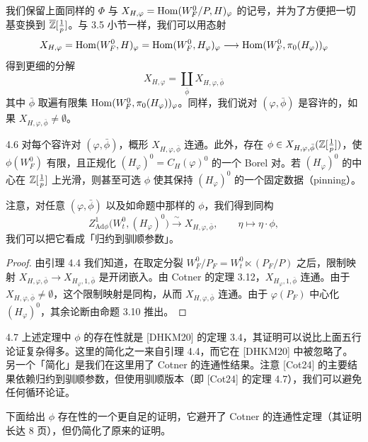 我们保留上面同样的 $\Phi$ 与 $X_{H,\varphi}=\operatorname{Hom}(W^0_F/P,H)_\varphi$ 的记号，并为了方便把一切基变换到 $\overline{\mathbb{Z}}[\frac1p]$。与 3.5 小节一样，我们可以用态射
\[
X_{H,\varphi}=\operatorname{Hom}(W^0_F,H)_\varphi=\operatorname{Hom}(W^0_F,H_\varphi)_\varphi
\longrightarrow\operatorname{Hom}(W^0_F,\pi_0(H_\varphi))_\varphi
\]
得到更细的分解
\[
X_{H,\varphi}=\coprod_{\bar\phi}X_{H,\varphi,\bar\phi}
\]
其中 $\bar\phi$ 取遍有限集 $\operatorname{Hom}(W^0_F,\pi_0(H_\varphi))_\varphi$。同样，我们说对 $(\varphi,\bar\phi)$ 是容许的，如果 $X_{H,\varphi,\bar\phi}\neq\emptyset$。

\begin{thm}{4.6}\label{thm:dat-4-6}
对每个容许对 $(\varphi,\bar\phi)$，概形 $X_{H,\varphi,\bar\phi}$ 连通。此外，存在 $\phi\in X_{H,\varphi,\bar\phi}(\mathbb{Z}[\frac1p])$，使 $\phi(W^0_F)$ 有限，且正规化 $(H_\varphi)^0=C_H(\varphi)^0$ 的一个 Borel 对。若 $(H_\varphi)^0$ 的中心在 $\mathbb{Z}[\frac1p]$ 上光滑，则甚至可选 $\phi$ 使其保持 $(H_\varphi)^0$ 的一个固定数据（pinning）。
\end{thm}

注意，对任意 $(\varphi,\bar\phi)$ 以及如命题中那样的 $\phi$，我们得到同构
\begin{equation*}\tag*{(4.1)}
Z^1_{\mathrm{Ad}\phi}\bigl(W^0_t,(H_\varphi)^0\bigr)
\xrightarrow{\ \sim\ }X_{H,\varphi,\bar\phi},\qquad \eta\mapsto\eta\cdot\phi,
\end{equation*}
我们可以把它看成「归约到驯顺参数」。

\begin{proof}
由引理 4.4 我们知道，在取定分裂 $W^0_F/P_F=W^0_t\ltimes(P_F/P)$ 之后，限制映射 $X_{H,\varphi,\bar\phi}\to X_{H_\varphi,1,\bar\phi}$ 是开闭嵌入。由 Cotner 的定理 3.12，$X_{H_\varphi,1,\bar\phi}$ 连通。由于 $X_{H,\varphi,\bar\phi}\neq\emptyset$，这个限制映射是同构，从而 $X_{H,\varphi,\bar\phi}$ 连通。由于 $\varphi(P_F)$ 中心化 $(H_\varphi)^0$，其余论断由命题 3.10 推出。
\end{proof}

\begin{rem}{4.7}
上述定理中 $\phi$ 的存在性就是 [DHKM20] 的定理 3.4，其证明可以说比上面五行论证复杂得多。这里的简化之一来自引理 4.4，而它在 [DHKM20] 中被忽略了。另一个「简化」是我们在这里用了 Cotner 的连通性结果。注意 [Cot24] 的主要结果依赖归约到驯顺参数，但使用驯顺版本（即 [Cot24] 的定理 4.7），我们可以避免任何循环论证。

下面给出 $\phi$ 存在性的一个更自足的证明，它避开了 Cotner 的连通性定理（其证明长达 8 页），但仍简化了原来的证明。
\end{rem}

